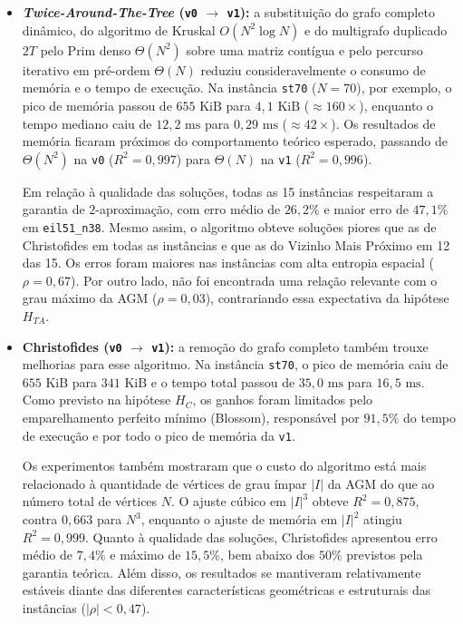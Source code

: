 \begin{itemize}
    \item \textbf{\textit{Twice-Around-The-Tree} (\texttt{v0} $\rightarrow$ \texttt{v1}):} a substituição do grafo completo dinâmico, do algoritmo de Kruskal $O(N^2 \log N)$ e do multigrafo duplicado $2T$ pelo Prim denso $\Theta(N^2)$ sobre uma matriz contígua e pelo percurso iterativo em pré-ordem $\Theta(N)$ reduziu consideravelmente o consumo de memória e o tempo de execução. Na instância \texttt{st70} ($N = 70$), por exemplo, o pico de memória passou de $655\text{ KiB}$ para $4{,}1\text{ KiB}$ ($\approx 160\times$), enquanto o tempo mediano caiu de $12{,}2\text{ ms}$ para $0{,}29\text{ ms}$ ($\approx 42\times$). Os resultados de memória ficaram próximos do comportamento teórico esperado, passando de $\Theta(N^2)$ na \texttt{v0} ($R^2 = 0{,}997$) para $\Theta(N)$ na \texttt{v1} ($R^2 = 0{,}996$).

    Em relação à qualidade das soluções, todas as 15 instâncias respeitaram a garantia de $2$-aproximação, com erro médio de $26{,}2\%$ e maior erro de $47{,}1\%$ em \texttt{eil51\_n38}. Mesmo assim, o algoritmo obteve soluções piores que as de Christofides em todas as instâncias e que as do Vizinho Mais Próximo em 12 das 15. Os erros foram maiores nas instâncias com alta entropia espacial ($\rho = 0{,}67$). Por outro lado, não foi encontrada uma relação relevante com o grau máximo da AGM ($\rho = 0{,}03$), contrariando essa expectativa da hipótese $H_{TA}$.

    \item \textbf{Christofides (\texttt{v0} $\rightarrow$ \texttt{v1}):} a remoção do grafo completo também trouxe melhorias para esse algoritmo. Na instância \texttt{st70}, o pico de memória caiu de $655\text{ KiB}$ para $341\text{ KiB}$ e o tempo total passou de $35{,}0\text{ ms}$ para $16{,}5\text{ ms}$. Como previsto na hipótese $H_C$, os ganhos foram limitados pelo emparelhamento perfeito mínimo (Blossom), responsável por $91{,}5\%$ do tempo de execução e por todo o pico de memória da \texttt{v1}.

    Os experimentos também mostraram que o custo do algoritmo está mais relacionado à quantidade de vértices de grau ímpar $|I|$ da AGM do que ao número total de vértices $N$. O ajuste cúbico em $|I|^3$ obteve $R^2 = 0{,}875$, contra $0{,}663$ para $N^3$, enquanto o ajuste de memória em $|I|^2$ atingiu $R^2 = 0{,}999$. Quanto à qualidade das soluções, Christofides apresentou erro médio de $7{,}4\%$ e máximo de $15{,}5\%$, bem abaixo dos $50\%$ previstos pela garantia teórica. Além disso, os resultados se mantiveram relativamente estáveis diante das diferentes características geométricas e estruturais das instâncias ($|\rho| < 0{,}47$).


\end{itemize}
